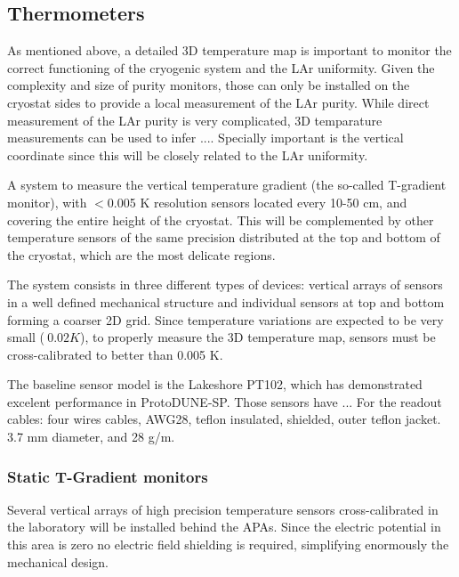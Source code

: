 \subsection{Thermometers}
\label{sec:fdsp-slow-cryo-therm}


As mentioned above, a detailed 3D temperature map is important to monitor the correct functioning of the cryogenic system and the LAr uniformity. 
Given the complexity and size of purity monitors, those can only be installed on the cryostat sides to provide a local measurement of
the LAr purity. While direct measurement of the LAr purity is very complicated, 3D temparature measurements can be used to infer ....
Specially important is the vertical coordinate since this will be closely related to the LAr uniformity. 

A system to measure the vertical temperature gradient (the so-called T-gradient monitor),
with $<$0.005 K resolution sensors located every 10-50 cm, and covering the entire height of the cryostat. This will be
complemented by other temperature sensors of the same precision distributed at the top and bottom of the cryostat,
which are the most delicate regions.  


The system consists in three different types of devices: vertical arrays of sensors in a well defined mechanical structure and individual sensors at top and bottom forming a
coarser 2D grid. Since temperature variations are expected to be very small ($~0.02 K$),
to properly measure the 3D temperature map, sensors must be cross-calibrated to better than 0.005 K. 


The baseline sensor model is the Lakeshore PT102, which has demonstrated excelent performance in ProtoDUNE-SP. Those sensors have  ...
For the readout cables: four wires cables, AWG28, teflon insulated, shielded, outer teflon jacket. 3.7 mm diameter, and 28 g/m.  

\subsubsection{Static T-Gradient monitors}

Several vertical arrays of high precision temperature sensors cross-calibrated in the laboratory will be installed behind the APAs.
Since the electric potential in this area is zero no electric field shielding is required, simplifying enormously the mechanical design.

